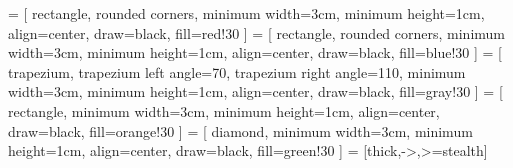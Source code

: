 \usetikzlibrary{shapes.geometric, arrows}
 = [
    rectangle, rounded corners, minimum width=3cm, minimum height=1cm,
    align=center, draw=black, fill=red!30
    ]
 = [
    rectangle, rounded corners, minimum width=3cm, minimum height=1cm,
    align=center, draw=black, fill=blue!30
    ]
 = [
    trapezium, trapezium left angle=70, trapezium right angle=110, 
    minimum width=3cm, minimum height=1cm, align=center, draw=black,
    fill=gray!30
    ]
 = [
    rectangle, minimum width=3cm, minimum height=1cm, align=center, 
    draw=black, fill=orange!30
    ]
 = [
    diamond, minimum width=3cm, minimum height=1cm, align=center, draw=black,
    fill=green!30
    ]
 = [thick,->,>=stealth]